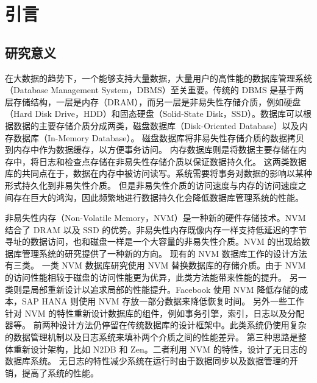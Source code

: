 
\chapter{引言}

\section{研究意义}

在大数据的趋势下，一个能够支持大量数据，大量用户的高性能的数据库管理系统（Database Management System，DBMS）至关重要。传统的 DBMS 是基于两层存储结构，一层是内存（DRAM），而另一层是非易失性存储介质，例如硬盘（Hard Disk Drive，HDD）和固态硬盘（Solid-State Disk，SSD）。数据库可以根据数据的主要存储介质分成两类，磁盘数据库（Disk-Oriented Database）以及内存数据库（In-Memory Database）。
磁盘数据库将非易失性存储介质的数据拷贝到内存中作为数据缓存，以方便事务访问。
内存数据库则是将数据主要存储在内存中，将日志和检查点存储在非易失性存储介质以保证数据持久化。
这两类数据库的共同点在于，数据在内存中被访问读写。系统需要将事务对数据的影响以某种形式持久化到非易失性介质。
但是非易失性介质的访问速度与内存的访问速度之间存在巨大的鸿沟，因此频繁地进行数据持久化会降低数据库管理系统的性能。

非易失性内存（Non-Volatile Memory，NVM）是一种新的硬件存储技术。NVM 结合了 DRAM 以及 SSD 的优势。非易失性内存既像内存一样支持低延迟的字节寻址的数据访问，也和磁盘一样是一个大容量的非易失性介质。NVM 的出现给数据库管理系统的研究提供了一种新的方向。
现有的 NVM 数据库工作的设计方法有三类。
一类 NVM 数据库研究使用 NVM 替换数据库的存储介质\cite{arulraj_lets_2015, van_renen_managing_2018,mariaDB}。由于 NVM 的访问性能相较于磁盘的访问性能更为优异，此类方法能带来性能的提升。
另一类则是局部重新设计以追求局部的性能提升。Facebook 使用 NVM 降低存储的成本\cite{facebook}，SAP HANA 则使用 NVM 存放一部分数据来降低恢复时间\cite{andrei_sap_2017}。
另外一些工作针对 NVM 的特性重新设计数据库的组件，例如事务引擎\cite{liu2018dudetx}，索引\cite{nv-tree,chen_persistent_2015,ma_roart_2021,arulraj2018bztree}，日志\cite{wbl}以及分配器\cite{pmdk,bhandari_makalu_2016}等。
前两种设计方法仍停留在传统数据库的设计框架中。此类系统仍使用复杂的数据管理机制以及日志系统来填补两个介质之间的性能差异。
第三种思路是整体重新设计架构，比如 N2DB\cite{liu_graduate_chinese} 和 Zen\cite{liu_zen_2021}。二者利用 NVM 的特性，设计了无日志的数据库系统。
无日志的特性减少系统在运行时由于数据同步以及数据管理的开销，提高了系统的性能。


